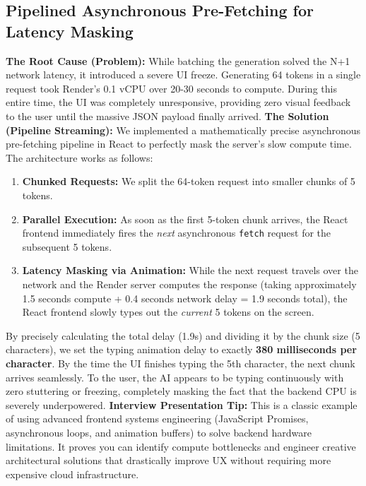 \documentclass[12pt, a4paper]{article}
\begin{document}
\subsection{Pipelined Asynchronous Pre-Fetching for Latency Masking}
\textbf{The Root Cause (Problem):} While batching the generation solved the N+1 network latency, it introduced a severe UI freeze. Generating 64 tokens in a single request took Render's 0.1 vCPU over 20-30 seconds to compute. During this entire time, the UI was completely unresponsive, providing zero visual feedback to the user until the massive JSON payload finally arrived.
\newline\newline
\textbf{The Solution (Pipeline Streaming):} We implemented a mathematically precise asynchronous pre-fetching pipeline in React to perfectly mask the server's slow compute time. The architecture works as follows:
\begin{enumerate}
    \item \textbf{Chunked Requests:} We split the 64-token request into smaller chunks of 5 tokens.
    \item \textbf{Parallel Execution:} As soon as the first 5-token chunk arrives, the React frontend immediately fires the \textit{next} asynchronous \texttt{fetch} request for the subsequent 5 tokens.
    \item \textbf{Latency Masking via Animation:} While the next request travels over the network and the Render server computes the response (taking approximately 1.5 seconds compute + 0.4 seconds network delay = 1.9 seconds total), the React frontend slowly types out the \textit{current} 5 tokens on the screen.
\end{enumerate}
By precisely calculating the total delay (1.9s) and dividing it by the chunk size (5 characters), we set the typing animation delay to exactly \textbf{380 milliseconds per character}. By the time the UI finishes typing the 5th character, the next chunk arrives seamlessly. To the user, the AI appears to be typing continuously with zero stuttering or freezing, completely masking the fact that the backend CPU is severely underpowered.
\newline\newline
\textbf{Interview Presentation Tip:} This is a classic example of using advanced frontend systems engineering (JavaScript Promises, asynchronous loops, and animation buffers) to solve backend hardware limitations. It proves you can identify compute bottlenecks and engineer creative architectural solutions that drastically improve UX without requiring more expensive cloud infrastructure.
\end{document}
